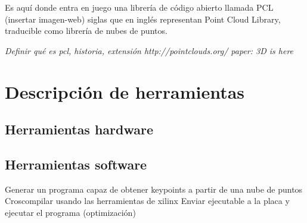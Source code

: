 Es aquí donde entra en juego una librería de código abierto llamada PCL (insertar imagen-web) siglas que en inglés representan Point Cloud Library, traducible como librería de nubes de puntos.

\textit{Definir qué es pcl, historia, extensión
http://pointclouds.org/
paper: 3D is here}


\section{Descripción de herramientas}
\subsection{Herramientas hardware}
\subsection{Herramientas software}


Generar un programa capaz de obtener keypoints a partir de una nube de puntos
Croscompilar usando las herramientas de xilinx 
Enviar ejecutable a la placa y ejecutar el programa
(optimización)

